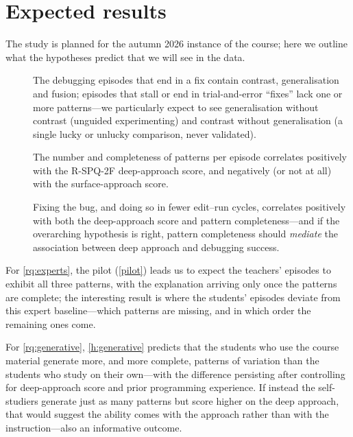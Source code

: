 \mode*
\section{Expected results}
\label{results}


The study is planned for the autumn 2026 instance of the course; here we
outline what the hypotheses predict that we will see in the data.

\begin{frame}
  \begin{description}
    \item[] The debugging episodes that end in a fix contain contrast,
      generalisation and fusion; episodes that stall or end in
      trial-and-error \enquote{fixes} lack one or more patterns---we
      particularly expect to see generalisation without contrast (unguided
      experimenting) and contrast without generalisation (a single lucky or
      unlucky comparison, never validated).
    \item[] The number and completeness of patterns per episode correlates
      positively with the R-SPQ-2F deep-approach score, and negatively (or
      not at all) with the surface-approach score.
    \item[] Fixing the bug, and doing so in fewer edit--run cycles,
      correlates positively with both the deep-approach score and pattern
      completeness---and if the overarching hypothesis is right, pattern
      completeness should \emph{mediate} the association between deep
      approach and debugging success.
  \end{description}
\end{frame}

For \cref{rq:experts}, the pilot (\cref{pilot})
leads us to expect the teachers' episodes
to exhibit all three patterns, with the explanation arriving only once the
patterns are complete; the interesting result is where the students'
episodes deviate from this expert baseline---which patterns are missing,
and in which order the remaining ones come.

For \cref{rq:generative}, \cref{h:generative} predicts that the students
who use the course material generate more, and more complete, patterns of
variation than the students who study on their own---with the difference
persisting after controlling for deep-approach score and prior programming
experience.
If instead the self-studiers generate just as many patterns but score higher
on the deep approach, that would suggest the ability comes with the approach
rather than with the instruction---also an informative outcome.

